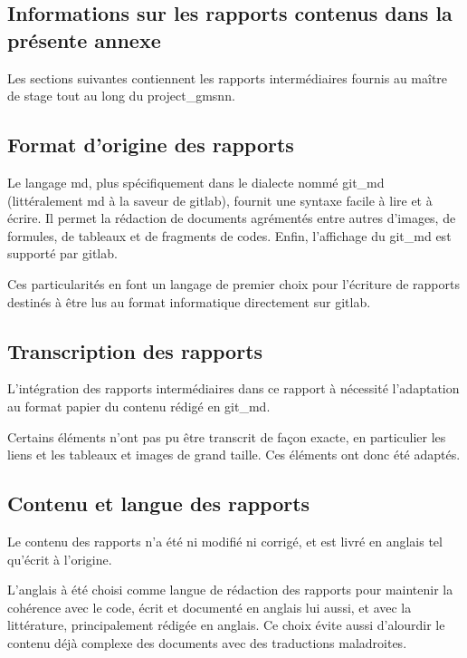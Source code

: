 
\begin{nohyphen}
\section{Informations sur les rapports contenus dans la présente annexe} \label{report_infos}
Les sections suivantes contiennent les rapports intermédiaires fournis au maître de stage tout au long du \gls{project_gmsnn}.

\subsection{Format d'origine des rapports}
Le langage \gls{md}, plus spécifiquement dans le dialecte nommé \gls{git_md} (littéralement \og \gls{md} à la saveur de \gls{gitlab}\fg{}), fournit une syntaxe facile à lire et à écrire. %
Il permet la rédaction de documents agrémentés entre autres d'images, de formules, de tableaux et de fragments de codes.
Enfin, l'affichage du \gls{git_md} est supporté par \gls{gitlab}. %

Ces particularités en font un langage de premier choix pour l'écriture de rapports destinés à être lus au format informatique directement sur \gls{gitlab}.

\subsection{Transcription des rapports}
L'intégration des rapports intermédiaires dans ce rapport à nécessité l'adaptation au format papier du contenu rédigé en \gls{git_md}.

Certains éléments n'ont pas pu être transcrit de façon exacte, en particulier les liens et les tableaux et images de grand taille. Ces éléments ont donc été adaptés.

\subsection{Contenu et langue des rapports}
Le contenu des rapports n'a été ni modifié ni corrigé, et est livré en anglais tel qu'écrit à l'origine.

L'anglais à été choisi comme langue de rédaction des rapports pour maintenir la cohérence avec le code, écrit et documenté en anglais lui aussi, et avec la littérature, principalement rédigée en anglais.
Ce choix évite aussi d'alourdir le contenu déjà complexe des documents avec des traductions maladroites. %

\end{nohyphen}


